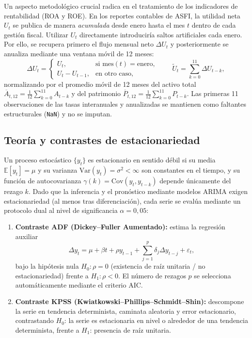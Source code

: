 \documentclass[11pt,letterpaper]{article}
\begin{document}
Un aspecto metodológico crucial radica en el tratamiento de los indicadores de rentabilidad (ROA y ROE). En los reportes contables de ASFI, la utilidad neta \(U_t\) se publica de manera \emph{acumulada} desde enero hasta el mes \(t\) dentro de cada gestión fiscal. Utilizar \(U_t\) directamente introduciría saltos artificiales cada enero. Por ello, se recupera primero el flujo mensual neto \(\Delta U_t\) y posteriormente se anualiza mediante una ventana móvil de 12 meses:
\[
\Delta U_t =
\begin{cases}
U_t, & \text{si } \text{mes}(t) = \text{enero}, \\
U_t - U_{t-1}, & \text{en otro caso},
\end{cases}
\qquad
\widetilde{U}_t = \sum_{k=0}^{11} \Delta U_{t-k},
\]
normalizando por el promedio móvil de 12 meses del activo total \(\overline{A}_{t,12} = \frac{1}{12}\sum_{k=0}^{11} A_{t-k}\) y del patrimonio \(\overline{P}_{t,12} = \frac{1}{12}\sum_{k=0}^{11} P_{t-k}\). Las primeras 11 observaciones de las tasas interanuales y anualizadas se mantienen como faltantes estructurales (\texttt{NaN}) y no se imputan.

\subsection{Teoría y contrastes de estacionariedad}

Un proceso estocástico \(\{y_t\}\) es estacionario en sentido débil si su media \(\mathbb{E}[y_t] = \mu\) y su varianza \(\text{Var}(y_t) = \sigma^2 < \infty\) son constantes en el tiempo, y su función de autocovarianza \(\gamma(k) = \text{Cov}(y_t, y_{t-k})\) depende únicamente del rezago \(k\). Dado que la inferencia y el pronóstico mediante modelos ARIMA exigen estacionariedad (al menos tras diferenciación), cada serie se evalúa mediante un protocolo dual al nivel de significancia \(\alpha = 0{,}05\):

\begin{enumerate}[leftmargin=1.5em]
  \item \textbf{Contraste ADF (Dickey--Fuller Aumentado):} estima la regresión auxiliar
  \[
  \Delta y_t = \mu + \beta t + \rho y_{t-1} + \sum_{j=1}^{p} \delta_j \Delta y_{t-j} + \varepsilon_t,
  \]
  bajo la hipótesis nula \(H_0: \rho = 0\) (existencia de raíz unitaria / no estacionariedad) frente a \(H_1: \rho < 0\). El número de rezagos \(p\) se selecciona automáticamente mediante el criterio AIC.
  \item \textbf{Contraste KPSS (Kwiatkowski--Phillips--Schmidt--Shin):} descompone la serie en tendencia determinista, caminata aleatoria y error estacionario, contrastando \(H_0\): la serie es estacionaria en nivel o alrededor de una tendencia determinista, frente a \(H_1\): presencia de raíz unitaria.
\end{enumerate}
\end{document}
